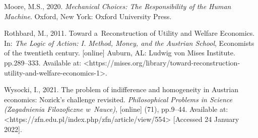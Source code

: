 Moore, M.S., 2020. \textit{Mechanical Choices: The Responsibility of the Human Machine}. Oxford, New York: Oxford University Press.



Rothbard, M., 2011. Toward a~Reconstruction of Utility and Welfare Economics. In: \textit{The Logic of Action: I. Method, Money, and the Austrian School}, Economists of the twentieth century. [online] Auburn, AL: Ludwig von Mises Institute. pp.289–333. Available at: {\textless}https://mises.org/library/toward-reconstruction-utility-and-welfare-economics-1{\textgreater}.



Wysocki, I., 2021. The problem of indifference and homogeneity in Austrian economics: Nozick's challenge revisited. \textit{Philosophical Problems in Science (Zagadnienia Filozoficzne w~Nauce)}, [online] (71), pp.9–44. Available at: {\textless}https://zfn.edu.pl/index.php/zfn/article/view/554{\textgreater} [Accessed 24 January 2022].



